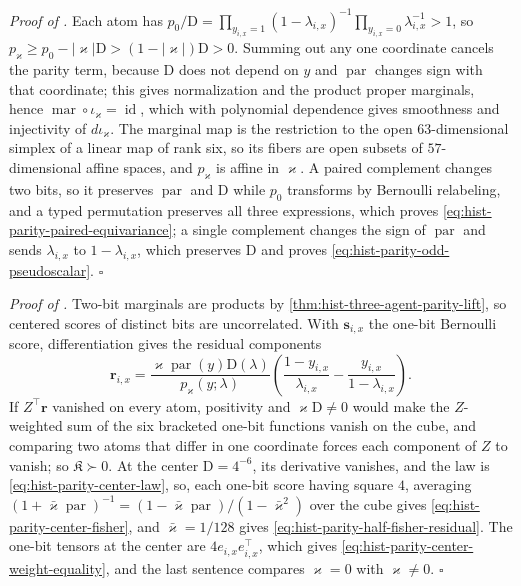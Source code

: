 \noindent\emph{Proof of .}
Each atom has $p_0/\mathrm D=\prod_{y_{i,x}=1}(1-\lambda_{i,x})^{-1}
\prod_{y_{i,x}=0}\lambda_{i,x}^{-1}>1$, so
$p_\varkappa\geq p_0-|\varkappa|\mathrm D>(1-|\varkappa|)\mathrm D>0$.  Summing out any
one coordinate cancels the parity term, because $\mathrm D$ does not depend on $y$ and
$\operatorname{par}$ changes sign with that coordinate; this gives normalization and the
product proper marginals, hence $\operatorname{mar}\circ\iota_\varkappa=\operatorname{id}$,
which with polynomial dependence gives smoothness and injectivity of
$d\iota_\varkappa$.  The marginal map is the restriction to the open $63$-dimensional
simplex of a linear map of rank six, so its fibers are open subsets of $57$-dimensional
affine spaces, and $p_\varkappa$ is affine in $\varkappa$.  A paired complement changes
two bits, so it preserves $\operatorname{par}$ and $\mathrm D$ while $p_0$ transforms by
Bernoulli relabeling, and a typed permutation preserves all three expressions, which
proves \eqref{eq:hist-parity-paired-equivariance}; a single complement changes the sign
of $\operatorname{par}$ and sends $\lambda_{i,x}$ to $1-\lambda_{i,x}$, which preserves
$\mathrm D$ and proves \eqref{eq:hist-parity-odd-pseudoscalar}.  $\square$

\noindent\emph{Proof of .}
Two-bit marginals are products by \cref{thm:hist-three-agent-parity-lift}, so centered
scores of distinct bits are uncorrelated.  With $\mathbf s_{i,x}$ the one-bit Bernoulli
score, differentiation gives the residual components
\begin{equation}
\mathbf r_{i,x}
=\frac{\varkappa\operatorname{par}(y)\mathrm D(\lambda)}{p_\varkappa(y;\lambda)}
\left(\frac{1-y_{i,x}}{\lambda_{i,x}}-\frac{y_{i,x}}{1-\lambda_{i,x}}\right).
\label{eq:hist-parity-score-residual-coordinate}
\end{equation}
If $Z^\top\mathbf r$ vanished on every atom, positivity and $\varkappa\mathrm D\ne0$
would make the $Z$-weighted sum of the six bracketed one-bit functions vanish on the
cube, and comparing two atoms that differ in one coordinate forces each component of $Z$
to vanish; so $\mathfrak K\succ0$.  At the center $\mathrm D=4^{-6}$, its derivative
vanishes, and the law is \eqref{eq:hist-parity-center-law},
so, each one-bit score having square $4$, averaging
$(1+\bar\varkappa\operatorname{par})^{-1}=(1-\bar\varkappa\operatorname{par})/(1-\bar\varkappa^2)$
over the cube gives \eqref{eq:hist-parity-center-fisher}, and $\bar\varkappa=1/128$ gives
\eqref{eq:hist-parity-half-fisher-residual}.  The one-bit tensors at the center are
$4e_{i,x}e_{i,x}^\top$, which gives \eqref{eq:hist-parity-center-weight-equality}, and the
last sentence compares $\varkappa=0$ with $\varkappa\ne0$.  $\square$

